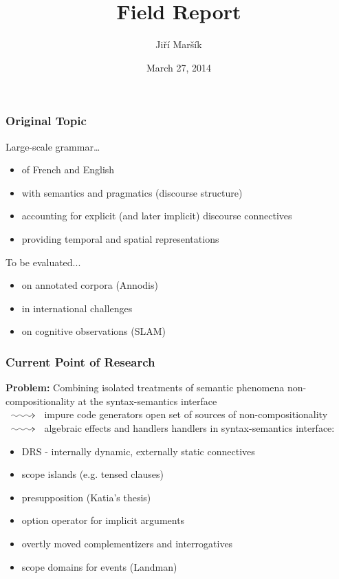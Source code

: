 \documentclass{beamer}
\makeatletter
\newcommand{\longsquiggly}{\xymatrix{{}\ar@{~>}[r]&{}}}
\makeatother
\begin{document}
\title[Effects \& Semantics]{Field Report}
\author{Jiří Maršík}
\date[February 2014]{March 27, 2014}

\frame{\titlepage \setcounter{framenumber}{1}}

\begin{frame}
  \frametitle{Original Topic}

  Large-scale grammar\ldots
  \pause
  \begin{itemize}
  \item of French and English
    \pause
  \item with semantics and pragmatics (discourse structure)
    \pause
  \item accounting for explicit (and later implicit) discourse connectives
    \pause
  \item providing temporal and spatial representations
  \end{itemize}
\pause
\vfill
  To be evaluated...
\pause
  \begin{itemize}
  \item on annotated corpora (Annodis)
    \pause
  \item in international challenges
    \pause
  \item on cognitive observations (SLAM)
  \end{itemize}
\end{frame}

\begin{frame}
  \frametitle{Current Point of Research}

  \textbf{Problem:} Combining isolated treatments of semantic phenomena
  \pause
  \vfill
  non-compositionality at the syntax-semantics interface \\
  $\longsquiggly$ impure code generators
  \pause
  \vfill
  open set of sources of non-compositionality \\
  $\longsquiggly$ algebraic effects and handlers
  \vfill
  \pause
  handlers in syntax-semantics interface:
  \begin{itemize}
  \item DRS - internally dynamic, externally static connectives
  \item scope islands (e.g. tensed clauses)
  \item presupposition (Katia's thesis)
  \item option operator for implicit arguments
  \item overtly moved complementizers and interrogatives
  \item scope domains for events (Landman)
  \end{itemize}
\end{frame}
\end{document}
